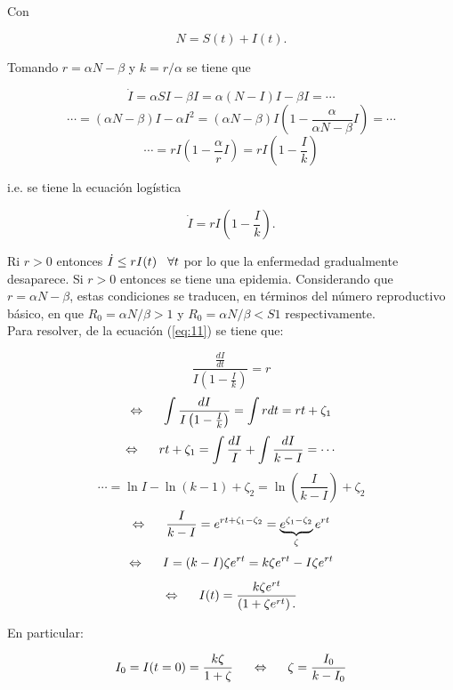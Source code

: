 \documentclass[10pt,oneside]{article}
\theoremstyle{definition}
\begin{document}
\begin{multicols}{2}
    Con
    
    \begin{equation}\label{eq:10}
        N=S(t)+I(t).
    \end{equation}
    
    Tomando $r=\alpha N-\beta$ y $ k=r/\alpha$ se tiene que 
    
    $$\dot I=\alpha SI-\beta I=\alpha (N-I)I-\beta I=\cdots $$ 
    $$\cdots=(\alpha N-\beta)I-\alpha I^2=(\alpha N-\beta)I\left(1-\frac{\alpha}{\alpha N-\beta}I\right)=\cdots$$
    $$\cdots=rI\left(1-\frac{\alpha}{r}I\right)=rI\left(1-\frac{I}{k}\right)$$
    
    i.e. se tiene la ecuación logística
    
    \begin{equation}\label{eq:11}
        \dot I=rI\left(1-\frac{I}{k}\right).
    \end{equation}
    
    Ri $r>0$ entonces $\dot I\leq rI(t) \hspace{0.3cm}\forall t$ por lo que la enfermedad gradualmente desaparece. Si $r>0$ entonces se tiene una epidemia. Considerando que $r=\alpha N-\beta$, estas condiciones se traducen, en términos del número reproductivo básico, en que $R_0=\alpha N/\beta>1$ y  $R_0=\alpha N/\beta<S1$ respectivamente.\\ \newline Para resolver, de la ecuación (\ref{eq:11}) se tiene que:
    
    $$\frac{\frac{dI}{dt}}{I\left(1-\frac{I}{k}\right)}=r$$
    $$\Leftrightarrow \hspace{0.5cm} \int \frac{dI}{I\left(1-\frac{I}{k}\right)}=\int r dt=rt+\zeta_1$$
    $$\Leftrightarrow \hspace{0.5cm} rt+\zeta_1=\int\frac{dI}{I}+\int\frac{dI}{k-I}=\cdots$$ $$\cdots=\ln I- \ln(k-1) + \zeta_2=\ln\left(\frac{I}{k-I}\right)+\zeta_2$$    
    $$\Leftrightarrow \hspace{0.5cm} \frac{I}{k-I}=e^{rt+\zeta_1-\zeta_2}=\underbrace{e^{\zeta_1-\zeta_2}}_{\zeta}e^{rt}$$
    $$\Leftrightarrow \hspace{0.5cm}I=(k-I)\zeta e^{rt}=k\zeta e^{rt}-I\zeta e^{rt}$$  $$\Leftrightarrow \hspace{0.5cm}I(t)=\frac{k \zeta e^{rt}}{\left(1+\zeta e^{rt}\right).}$$
    
   En particular:
   
   $$I_0=I(t=0)=\frac{k\zeta}{1+\zeta}\hspace{0.5cm}\Leftrightarrow\hspace{0.5cm} \zeta=\frac{I_0}{k-I_0}$$
   

\end{multicols}
\end{document}
